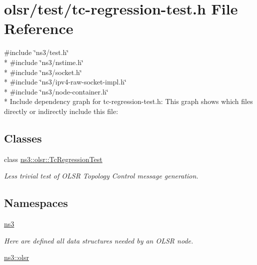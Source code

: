 \hypertarget{tc-regression-test_8h}{}\section{olsr/test/tc-\/regression-\/test.h File Reference}
\label{tc-regression-test_8h}
{\ttfamily \#include \char`\"{}ns3/test.\+h\char`\"{}}\\*
{\ttfamily \#include \char`\"{}ns3/nstime.\+h\char`\"{}}\\*
{\ttfamily \#include \char`\"{}ns3/socket.\+h\char`\"{}}\\*
{\ttfamily \#include \char`\"{}ns3/ipv4-\/raw-\/socket-\/impl.\+h\char`\"{}}\\*
{\ttfamily \#include \char`\"{}ns3/node-\/container.\+h\char`\"{}}\\*
Include dependency graph for tc-\/regression-\/test.h\+:
This graph shows which files directly or indirectly include this file\+:
\subsection*{Classes}
\begin{DoxyCompactItemize}
\item 
class \hyperlink{classns3_1_1olsr_1_1TcRegressionTest}{ns3\+::olsr\+::\+Tc\+Regression\+Test}
\begin{DoxyCompactList}\small\item\em Less trivial test of O\+L\+SR Topology Control message generation. \end{DoxyCompactList}\end{DoxyCompactItemize}
\subsection*{Namespaces}
\begin{DoxyCompactItemize}
\item 
 \hyperlink{namespacens3}{ns3}
\begin{DoxyCompactList}\small\item\em Here are defined all data structures needed by an O\+L\+SR node. \end{DoxyCompactList}\item 
 \hyperlink{namespacens3_1_1olsr}{ns3\+::olsr}
\end{DoxyCompactItemize}
